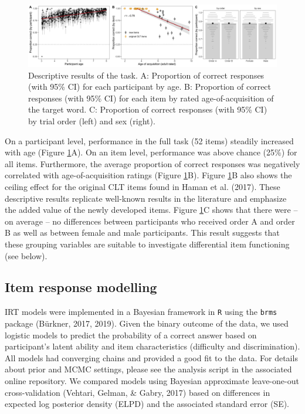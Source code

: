 \documentclass[
  man,floatsintext]{apa6}
\begin{document}
\begin{figure}

{\centering \includegraphics[width=1\linewidth]{../graphs/data_fig} 

}

\caption{Descriptive results of the task. A: Proportion of correct responses (with 95\% CI) for each participant by age. B: Proportion of correct responses (with 95\% CI) for each item by rated age-of-acquisition of the target word. C: Proportion of correct responses (with 95\% CI) by trial order (left) and sex (right).}\label{fig:fig2}
\end{figure}

On a participant level, performance in the full task (52 items) steadily increased with age (Figure \ref{fig:fig2}A). On an item level, performance was above chance (25\%) for all items. Furthermore, the average proportion of correct responses was negatively correlated with age-of-acquisition ratings (Figure \ref{fig:fig2}B). Figure \ref{fig:fig2}B also shows the ceiling effect for the original CLT items found in Haman et al. (2017). These descriptive results replicate well-known results in the literature and emphasize the added value of the newly developed items. Figure \ref{fig:fig2}C shows that there were -- on average -- no differences between participants who received order A and order B as well as between female and male participants. This result suggests that these grouping variables are suitable to investigate differential item functioning (see below).

\hypertarget{item-response-modelling}{%
\subsection{Item response modelling}\label{item-response-modelling}}

IRT models were implemented in a Bayesian framework in \texttt{R} using the \texttt{brms} package (Bürkner, 2017, 2019). Given the binary outcome of the data, we used logistic models to predict the probability of a correct answer based on participant's latent ability and item characteristics (difficulty and discrimination). All models had converging chains and provided a good fit to the data. For details about prior and MCMC settings, please see the analysis script in the associated online repository. We compared models using Bayesian approximate leave-one-out cross-validation (Vehtari, Gelman, \& Gabry, 2017) based on differences in expected log posterior density (ELPD) and the associated standard error (SE).
\end{document}
